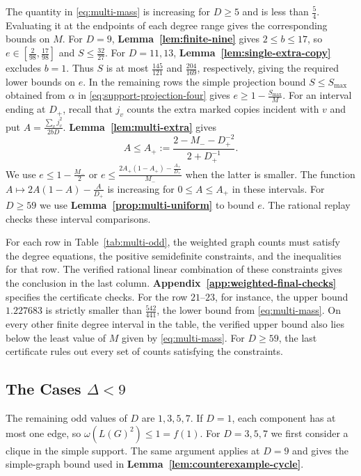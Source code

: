 The quantity in \eqref{eq:multi-mass} is increasing for $D\ge5$ and is
less than $\frac{5}{4}$. Evaluating it at the endpoints of each degree
range gives the corresponding bounds on $M$.
For $D=9$, \textbf{Lemma~\ref{lem:finite-nine}} gives $2\le b\le17$, so
$e\in[\frac{2}{98},\frac{17}{98}]$ and $S\le\frac{32}{27}$. For $D=11,13$,
\textbf{Lemma~\ref{lem:single-extra-copy}} excludes $b=1$. Thus $S$ is at most
$\frac{145}{121}$ and $\frac{204}{169}$, respectively, giving the required lower
bounds on $e$. In the remaining rows the simple projection bound
$S\le S_{\max}$ obtained from $\alpha$
in \eqref{eq:support-projection-four} gives $e\ge1-\frac{S_{\max}}{M}$. For an
interval ending at $D_+$, recall that $j_v$ counts the extra marked
copies incident with $v$ and put $A=\frac{\sum_v j_v^2}{2bD}$.
\textbf{Lemma~\ref{lem:multi-extra}} gives
\[
 A\le A_+:=\frac{2-M_--D_+^{-2}}{2+D_+^{-1}}.
\]
We use $e\le1-\frac{M_-}{2}$ or
$e\le\frac{2A_+(1-A_+)-\frac{A_+}{D_+}}{M_-}$ when the latter is smaller.
The function $A\mapsto 2A(1-A)-\frac{A}{D_+}$ is increasing for
$0\le A\le A_+$ in these intervals.
For $D\ge59$ we use \textbf{Lemma~\ref{prop:multi-uniform}} to bound $e$.
The rational replay checks these interval comparisons.



For each row in Table~\ref{tab:multi-odd}, the weighted graph counts must
satisfy the degree equations, the positive semidefinite constraints,
and the inequalities for that row. The verified rational linear
combination of these constraints gives the conclusion in the last
column. \textbf{Appendix~\ref{app:weighted-final-checks}} specifies the
certificate checks. For the row $21$--$23$, for instance, the
upper bound $1.227683$ is strictly smaller than $\frac{542}{441}$, the lower
bound from \eqref{eq:multi-mass}. On every other finite degree
interval in the table, the verified upper bound also lies below
the least value of $M$ given by \eqref{eq:multi-mass}. For
$D\geq59$, the last certificate rules out every set of counts
satisfying the constraints.

\subsection{The Cases \texorpdfstring{$\Delta<9$}{Delta < 9}}\label{subsec:exact-small-degree}

The remaining odd values of $D$ are $1,3,5,7$. If $D=1$, each
component has at most one edge, so $\omega(L(G)^2)\leq1=f(1)$.
For $D=3,5,7$ we first consider a clique in the simple support.
The same argument applies at $D=9$ and gives the simple-graph
bound used in \textbf{Lemma~\ref{lem:counterexample-cycle}}.

